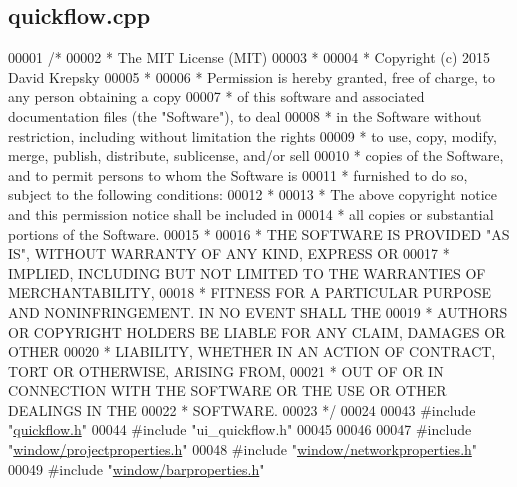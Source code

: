 \hypertarget{quickflow_8cpp_source}{}\subsection{quickflow.\+cpp}
\label{quickflow_8cpp_source}

\begin{DoxyCode}
00001 \textcolor{comment}{/*}
00002 \textcolor{comment}{ * The MIT License (MIT)}
00003 \textcolor{comment}{ *}
00004 \textcolor{comment}{ * Copyright (c) 2015 David Krepsky}
00005 \textcolor{comment}{ *}
00006 \textcolor{comment}{ * Permission is hereby granted, free of charge, to any person obtaining a copy}
00007 \textcolor{comment}{ * of this software and associated documentation files (the "Software"), to deal}
00008 \textcolor{comment}{ * in the Software without restriction, including without limitation the rights}
00009 \textcolor{comment}{ * to use, copy, modify, merge, publish, distribute, sublicense, and/or sell}
00010 \textcolor{comment}{ * copies of the Software, and to permit persons to whom the Software is}
00011 \textcolor{comment}{ * furnished to do so, subject to the following conditions:}
00012 \textcolor{comment}{ *}
00013 \textcolor{comment}{ * The above copyright notice and this permission notice shall be included in}
00014 \textcolor{comment}{ * all copies or substantial portions of the Software.}
00015 \textcolor{comment}{ *}
00016 \textcolor{comment}{ * THE SOFTWARE IS PROVIDED "AS IS", WITHOUT WARRANTY OF ANY KIND, EXPRESS OR}
00017 \textcolor{comment}{ * IMPLIED, INCLUDING BUT NOT LIMITED TO THE WARRANTIES OF MERCHANTABILITY,}
00018 \textcolor{comment}{ * FITNESS FOR A PARTICULAR PURPOSE AND NONINFRINGEMENT. IN NO EVENT SHALL THE}
00019 \textcolor{comment}{ * AUTHORS OR COPYRIGHT HOLDERS BE LIABLE FOR ANY CLAIM, DAMAGES OR OTHER}
00020 \textcolor{comment}{ * LIABILITY, WHETHER IN AN ACTION OF CONTRACT, TORT OR OTHERWISE, ARISING FROM,}
00021 \textcolor{comment}{ * OUT OF OR IN CONNECTION WITH THE SOFTWARE OR THE USE OR OTHER DEALINGS IN THE}
00022 \textcolor{comment}{ * SOFTWARE.}
00023 \textcolor{comment}{ */}
00024 
00043 \textcolor{preprocessor}{#include "\hyperlink{quickflow_8h}{quickflow.h}"}
00044 \textcolor{preprocessor}{#include "ui\_quickflow.h"}
00045 
00046 
00047 \textcolor{preprocessor}{#include "\hyperlink{projectproperties_8h}{window/projectproperties.h}"}
00048 \textcolor{preprocessor}{#include "\hyperlink{networkproperties_8h}{window/networkproperties.h}"}
00049 \textcolor{preprocessor}{#include "\hyperlink{barproperties_8h}{window/barproperties.h}"}

\end{DoxyCode}
